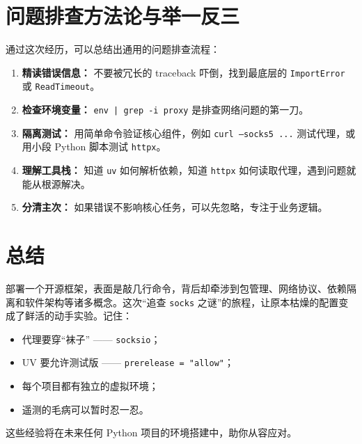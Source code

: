 \documentclass[12pt,a4paper]{ctexart}
\begin{document}
\section{问题排查方法论与举一反三}
通过这次经历，可以总结出通用的问题排查流程：
\begin{enumerate}[label=\textbf{Step \arabic*.}, itemsep=0pt]
    \item \textbf{精读错误信息：} 不要被冗长的 traceback 吓倒，找到最底层的 \texttt{ImportError} 或 \texttt{ReadTimeout}。
    \item \textbf{检查环境变量：} \texttt{env | grep -i proxy} 是排查网络问题的第一刀。
    \item \textbf{隔离测试：} 用简单命令验证核心组件，例如 \texttt{curl --socks5 ...} 测试代理，或用小段 Python 脚本测试 \texttt{httpx}。
    \item \textbf{理解工具栈：} 知道 \texttt{uv} 如何解析依赖，知道 \texttt{httpx} 如何读取代理，遇到问题就能从根源解决。
    \item \textbf{分清主次：} 如果错误不影响核心任务，可以先忽略，专注于业务逻辑。
\end{enumerate}

\section*{总结}
部署一个开源框架，表面是敲几行命令，背后却牵涉到包管理、网络协议、依赖隔离和软件架构等诸多概念。这次“追查 \texttt{socks} 之谜”的旅程，让原本枯燥的配置变成了鲜活的动手实验。记住：
\begin{itemize}
    \item 代理要穿“袜子” —— \texttt{socksio}；
    \item UV 要允许测试版 —— \texttt{prerelease = "allow"}；
    \item 每个项目都有独立的虚拟环境；
    \item 遥测的毛病可以暂时忍一忍。
\end{itemize}
这些经验将在未来任何 Python 项目的环境搭建中，助你从容应对。
\end{document}
